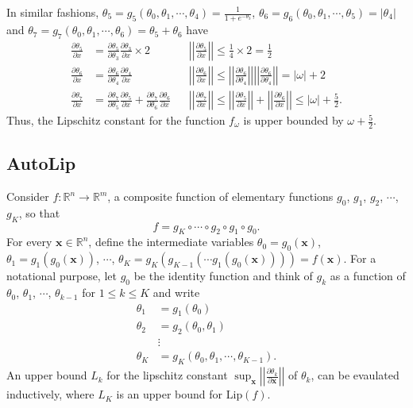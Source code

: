 \documentclass[12pt]{report}
\numberwithin{figure}{chapter}
\theoremstyle{plain}
\theoremstyle{definition}
\theoremstyle{corollary}
\theoremstyle{definition}
\theoremstyle{plain}
\theoremstyle{definition}
\theoremstyle{plain}
\newcommand\lip{\ensuremath{\text{Lip}}}
\newcommand\pa[2]{\ensuremath{\frac{\partial #1}{\partial #2}}}
\newcommand\norm[1]{\ensuremath{\left|\left|#1\right|\right|}}
\begin{document}
In similar fashions,
\(\theta_5=g_5(\theta_0,\theta_1,\cdots,\theta_4)=\frac1{1+e^{-\theta_3}}\),
\(\theta_6=g_6(\theta_0,\theta_1,\cdots,\theta_5)=|\theta_4|\) and
\(\theta_7=g_7(\theta_0,\theta_1,\cdots,\theta_6)=\theta_5+\theta_6\) have
\begin{align*}
\pa{\theta_5}x&=\pa{\theta_5}{\theta_3}\pa{\theta_3}x\times 2&&\norm{\pa{\theta_5}x}\le\frac14\times2=\frac12\\
\pa{\theta_6}x&=\pa{\theta_6}{\theta_4}\pa{\theta_4}x&&\norm{\pa{\theta_6}x}
\le\norm{\pa{\theta_6}{\theta_4}}\norm{\pa{\theta_6}{\theta_4}}=|\omega|+2\\
\pa{\theta_7}x&=\pa{\theta_7}{\theta_5}\pa{\theta_5}x+\pa{\theta_7}{\theta_6}\pa{\theta_6}x&&\norm{\pa{\theta_7}x}
\le\norm{\pa{\theta_5}x}+\norm{\pa{\theta_6}x}\le|\omega|+\frac52.
\end{align*}
Thus, the Lipschitz constant for the function \(f_\omega\) is upper bounded by \(\omega+\frac52\).

\subsection{AutoLip}
Consider \(f:\mathbb R^n\to\mathbb R^m\), a composite function of elementary functions \(g_0\), \(g_1\), \(g_2\), \(\cdots\), \(g_K\), so that
\[f={g_K}\circ\cdots\circ{g_2}\circ{g_1}\circ{g_0}.\]
For every \(\boldsymbol x\in\mathbb R^n\), define the intermediate variables
\(\theta_0=g_0(\boldsymbol x)\), \(\theta_1=g_1(g_0(\boldsymbol x))\), \(\cdots\), \(\theta_K=g_K(g_{K-1}(\cdots g_1(g_0(\boldsymbol x))))=f(\boldsymbol x)\).
For a notational purpose, let \(g_0\) be the identity function and think of \(g_k\) as a function of \(\theta_0\), \(\theta_1\), \(\cdots\), \(\theta_{k-1}\) for \(1\le k\le K\) and write
\begin{align*}
\theta_1&=g_1(\theta_0)\\
\theta_2&=g_2(\theta_0,\theta_1)\\
&\vdots\\
\theta_K&=g_K(\theta_0,\theta_1,\cdots,\theta_{K-1}).
\end{align*}
An upper bound \(L_k\) for the lipschitz constant \(\sup_{\boldsymbol x}\left|\left|\frac{\partial\theta_k}{\partial\boldsymbol x}\right|\right|\) of \(\theta_k\), can be evaulated inductively, where \(L_K\) is an upper bound for \(\lip(f)\).
\end{document}
